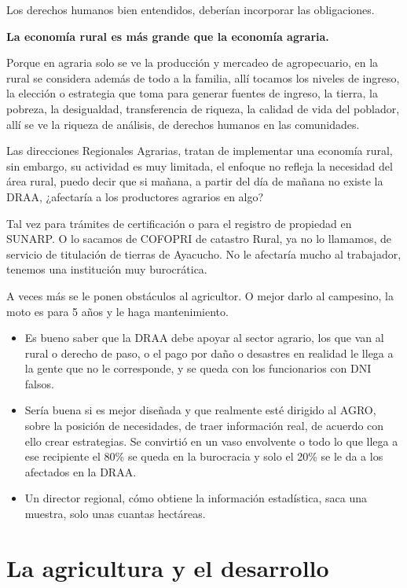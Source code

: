 \documentclass[
  letterpaper,
  DIV=11,
  numbers=noendperiod]{scrartcl}
\begin{document}
Los derechos humanos bien entendidos, deberían incorporar las
obligaciones.

\textbf{La economía rural es más grande que la economía agraria.}

Porque en agraria solo se ve la producción y mercadeo de agropecuario,
en la rural se considera además de todo a la familia, allí tocamos los
niveles de ingreso, la elección o estrategia que toma para generar
fuentes de ingreso, la tierra, la pobreza, la desigualdad, transferencia
de riqueza, la calidad de vida del poblador, allí se ve la riqueza de
análisis, de derechos humanos en las comunidades.

Las direcciones Regionales Agrarias, tratan de implementar una economía
rural, sin embargo, su actividad es muy limitada, el enfoque no refleja
la necesidad del área rural, puedo decir que si mañana, a partir del día
de mañana no existe la DRAA, ¿afectaría a los productores agrarios en
algo?

Tal vez para trámites de certificación o para el registro de propiedad
en SUNARP. O lo sacamos de COFOPRI de catastro Rural, ya no lo llamamos,
de servicio de titulación de tierras de Ayacucho. No le afectaría mucho
al trabajador, tenemos una institución muy burocrática.

A veces más se le ponen obstáculos al agricultor. O mejor darlo al
campesino, la moto es para 5 años y le haga mantenimiento.

\begin{itemize}
\item
  Es bueno saber que la DRAA debe apoyar al sector agrario, los que van
  al rural o derecho de paso, o el pago por daño o desastres en realidad
  le llega a la gente que no le corresponde, y se queda con los
  funcionarios con DNI falsos.
\item
  Sería buena si es mejor diseñada y que realmente esté dirigido al
  AGRO, sobre la posición de necesidades, de traer información real, de
  acuerdo con ello crear estrategias. Se convirtió en un vaso envolvente
  o todo lo que llega a ese recipiente el 80\% se queda en la burocracia
  y solo el 20\% se le da a los afectados en la DRAA.
\item
  Un director regional, cómo obtiene la información estadística, saca
  una muestra, solo unas cuantas hectáreas.
\end{itemize}

\hypertarget{la-agricultura-y-el-desarrollo}{%
\section{La agricultura y el
desarrollo}\label{la-agricultura-y-el-desarrollo}}
\end{document}
